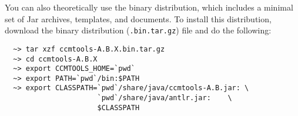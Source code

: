 You can also theoretically use the binary distribution, which includes a minimal
set of Jar archives, templates, and documents. To install this distribution,
download the binary distribution ({\tt *.bin.tar.gz}) file and do the following:
\begin{small}
\begin{verbatim}
  ~> tar xzf ccmtools-A.B.X.bin.tar.gz
  ~> cd ccmtools-A.B.X
  ~> export CCMTOOLS_HOME=`pwd`
  ~> export PATH=`pwd`/bin:$PATH
  ~> export CLASSPATH=`pwd`/share/java/ccmtools-A.B.jar: \
                      `pwd`/share/java/antlr.jar:    \
                      $CLASSPATH
\end{verbatim}
\end{small}

